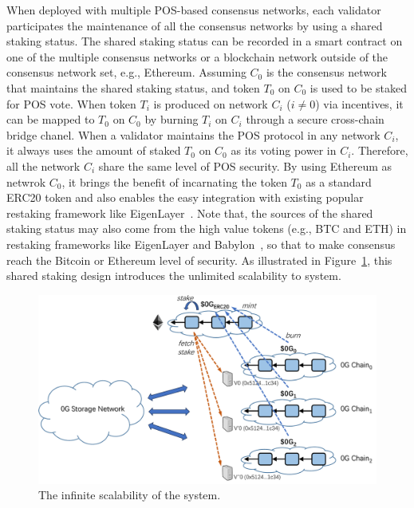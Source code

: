 When deployed with multiple POS-based consensus networks, each validator participates the maintenance of all the consensus networks by using a shared staking status.
The shared staking status can be recorded in a smart contract on one of the multiple consensus networks or a blockchain network outside of the \projabbrev consensus network set, e.g., Ethereum. 
Assuming $C_0$ is the consensus network that maintains the shared staking status, and token $T_0$ on $C_0$ is used to be staked for POS vote.  
When token $T_i$ is produced on network $C_i$ ($i \neq 0$) via incentives, it can be mapped to $T_0$ on $C_0$ by burning $T_i$ on $C_i$ through a secure cross-chain bridge chanel.
When a validator maintains the POS protocol in any network $C_i$, it always uses the amount of staked $T_0$ on $C_0$ as its voting power in $C_i$. 
Therefore, all the network $C_i$ share the same level of POS security. 
By using Ethereum as netwrok $C_0$, it brings the benefit of incarnating the token $T_0$ as a standard ERC20 token and also enables the easy integration with existing popular restaking framework like EigenLayer~\cite{eigenlayer}.
Note that, the sources of the shared staking status may also come from the high value tokens (e.g., BTC and ETH) in restaking frameworks like EigenLayer and Babylon~\cite{babylon}, so that to make \projabbrev consensus reach the Bitcoin or Ethereum level of security.  
As illustrated in Figure~\ref{fig:scale}, this shared staking design introduces the unlimited scalability to \projabbrev system.

\begin{figure}[H]	
	\includegraphics[width=\textwidth]{figure/scale.pdf}
	\caption{The infinite scalability of the \projabbrev system.}
	\label{fig:scale}
\end{figure}

